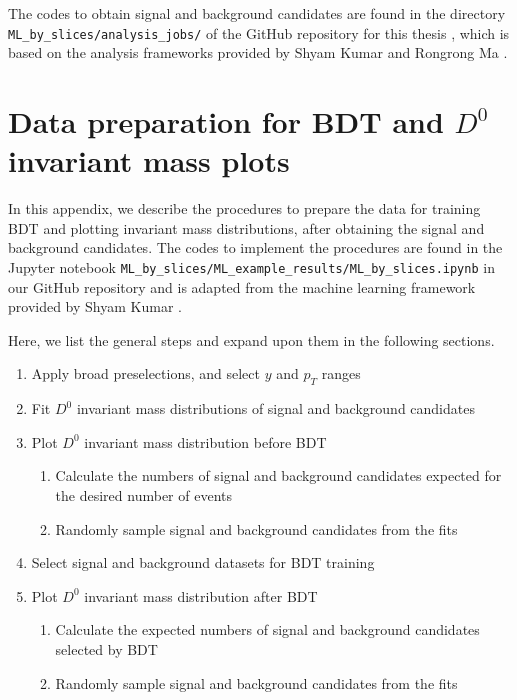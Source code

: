 The codes to obtain signal and background candidates are found in the directory \texttt{ML\_by\_slices/analysis\_jobs/} of the GitHub repository for this thesis \cite{github}, which is based on the analysis frameworks provided by Shyam Kumar \cite{Shyam_analysis} and Rongrong Ma \cite{Rongrong_jobs}.

\chapter{Data preparation for BDT and $D^0$ invariant mass plots}
\label{app.data_prep}

In this appendix, we describe the procedures to prepare the data for training BDT and plotting invariant mass distributions, after obtaining the signal and background candidates. The codes to implement the procedures are found in the Jupyter notebook \texttt{ML\_by\_slices/ML\_example\_results/ML\_by\_slices.ipynb} in our GitHub repository \cite{github} and is adapted from the machine learning framework provided by Shyam Kumar \cite{Shyam_ml}.

Here, we list the general steps and expand upon them in the following sections.
\begin{enumerate}
    \item Apply broad preselections, and select $y$ and $p_T$ ranges
    \item Fit $D^0$ invariant mass distributions of signal and background candidates
    \item Plot $D^0$ invariant mass distribution before BDT
    \begin{enumerate}
        \item Calculate the numbers of signal and background candidates expected for the desired number of events
        \item Randomly sample signal and background candidates from the fits
    \end{enumerate}
    \item Select signal and background datasets for BDT training
    \item Plot $D^0$ invariant mass distribution after BDT
    \begin{enumerate}
        \item Calculate the expected numbers of signal and background candidates selected by BDT
        \item Randomly sample signal and background candidates from the fits
    \end{enumerate}
\end{enumerate}



